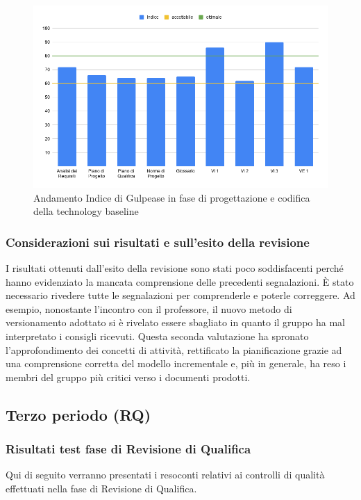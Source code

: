 \documentclass[../piano_di_qualifica.tex]{subfiles}
\begin{document}
\begin{figure}[H]
	\centering
	\includegraphics[width=14cm]{src/img/media_gul_RP.png}
	\caption{Andamento Indice di Gulpease in fase di progettazione e codifica della technology baseline}
\end{figure}

\subsubsection{Considerazioni sui risultati e sull’esito della revisione}
I risultati ottenuti dall'esito della revisione sono stati poco soddisfacenti perché hanno evidenziato la mancata comprensione delle precedenti segnalazioni. È stato necessario rivedere tutte le segnalazioni per comprenderle e poterle correggere. Ad esempio, nonostante l'incontro con il professore, il nuovo metodo di versionamento adottato si è rivelato essere sbagliato in quanto il gruppo ha mal interpretato i consigli ricevuti.
Questa seconda valutazione ha spronato l'approfondimento dei concetti di attività, rettificato la pianificazione grazie ad una comprensione corretta del modello incrementale e, più in generale, ha reso i membri del gruppo più critici verso i documenti prodotti.

\subsection{Terzo periodo (RQ)}
\label{sub:periodo-RQ}
\subsubsection{Risultati test fase di Revisione di Qualifica}
Qui di seguito verranno presentati i resoconti relativi ai controlli di qualità effettuati nella fase di Revisione di Qualifica.
\end{document}
